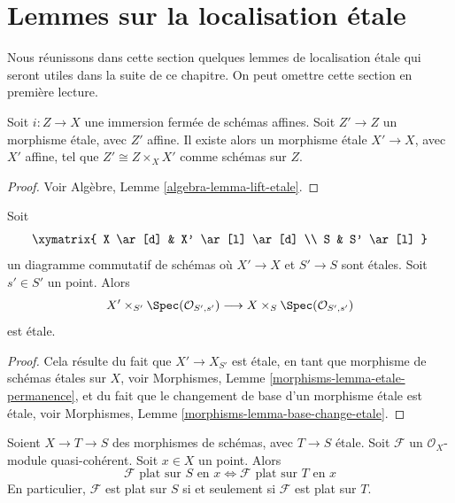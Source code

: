 \section{Lemmes sur la localisation \'etale}
\label{section-etale-localization}

\noindent
Nous réunissons dans cette section quelques lemmes de localisation \'etale qui seront
utiles dans la suite de ce chapitre. On peut omettre cette section en première lecture.

\begin{lemma}
\label{lemma-lift-etale}
Soit $i : Z \to X$ une immersion fermée de schémas affines.
Soit $Z' \to Z$ un morphisme \'etale, avec $Z'$ affine.
Il existe alors un morphisme \'etale $X' \to X$, avec $X'$
affine, tel que $Z' \cong Z \times_X X'$ comme schémas sur $Z$.
\end{lemma}

\begin{proof}
Voir
Algèbre, Lemme \ref{algebra-lemma-lift-etale}.
\end{proof}

\begin{lemma}
\label{lemma-etale-at-point}
Soit
$$
\xymatrix{
X \ar[d] & X' \ar[l] \ar[d] \\
S & S' \ar[l]
}
$$
un diagramme commutatif de schémas où $X' \to X$ et $S' \to S$ sont \'etales.
Soit $s' \in S'$ un point. Alors
$$
X' \times_{S'} \Spec(\mathcal{O}_{S', s'})
\longrightarrow
X \times_S \Spec(\mathcal{O}_{S', s'})
$$
est \'etale.
\end{lemma}

\begin{proof}
Cela résulte du fait que $X' \to X_{S'}$ est \'etale, en tant que morphisme de
schémas \'etales sur $X$, voir
Morphismes, Lemme \ref{morphisms-lemma-etale-permanence},
et du fait que le changement de base d'un morphisme \'etale est \'etale, voir
Morphismes, Lemme \ref{morphisms-lemma-base-change-etale}.
\end{proof}

\begin{lemma}
\label{lemma-etale-flat-up-down}
Soient $X \to T \to S$ des morphismes de schémas, avec $T \to S$ \'etale.
Soit $\mathcal{F}$ un $\mathcal{O}_X$-module quasi-cohérent.
Soit $x \in X$ un point. Alors
$$
\mathcal{F}\text{ plat sur }S\text{ en }x
\Leftrightarrow
\mathcal{F}\text{ plat sur }T\text{ en }x
$$
En particulier, $\mathcal{F}$ est plat sur $S$ si et seulement si $\mathcal{F}$
est plat sur $T$.
\end{lemma}

